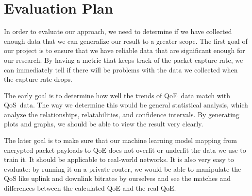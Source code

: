 \section{Evaluation Plan}\label{evaluation}
    In order to evaluate our approach, we need to determine if we have collected enough data that we can generalize our result to a greater scope. The first goal of our project is to ensure that we have reliable data that are significant enough for our research. By having a metric that keeps track of the packet capture rate, we can immediately tell if there will be problems with the data we collected when the capture rate drops.

    The early goal is to determine how well the trends of QoE~data match with QoS~data. The way we determine this would be general statistical analysis, which analyze the relationships, relatabilities, and confidence intervals. By generating plots and graphs, we should be able to view the result very clearly.

    The later goal is to make sure that our machine learning model mapping from encrypted packet payloads to QoE does not overfit or underfit the data we use to train it. It should be applicable to real-world networks. It is also very easy to evaluate: by running it on a private router, we would be able to manipulate the QoS like uplink and downlink bitrates by ourselves and see the matches and differences between the calculated QoE and the real QoE. 

